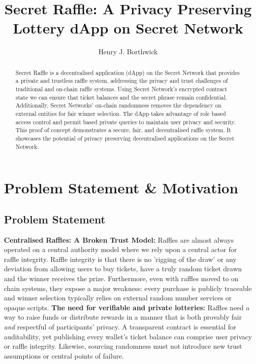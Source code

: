 \documentclass[9pt]{extarticle}
\title{Secret Raffle: A Privacy Preserving Lottery dApp on Secret Network}
\author{Henry J. Borthwick}
\begin{document}
\maketitle

\begin{abstract}
Secret Raffle is a decentralised application (dApp) on the Secret Network that provides a private and trustless raffle system, addressing the privacy and trust challenges of traditional and on-chain raffle systems. Using Secret Network's encrypted contract state we can ensure that ticket balances and the secret phrase remain confidential. Additionally, Secret Networks' on-chain randomness removes the dependency on external entities for fair winner selection. The dApp takes advantage of role based access control and permit based private queries to maintain user privacy and security. This proof of concept demonstrates a secure, fair, and decentralised raffle system. It showcases the potential of privacy preserving decentralised applications on the Secret Network.
\end{abstract}

\section{Problem Statement \& Motivation}
\subsection{Problem Statement}
\textbf{Centralised Raffles: A Broken Trust Model:} Raffles are almost always operated on a central authority model where we rely upon a central actor for raffle integrity. Raffle integrity is that there is no 'rigging of the draw' or any deviation from allowing users to buy tickets, have a truly random ticket drawn and the winner receives the prize. Furthermore, even with raffles moved to on chain systems, they expose a major weakness: every purchase is publicly traceable and winner selection typically relies on external random number services or opaque scripts. \textbf{The need for verifiable and private lotteries:} Raffles need a way to raise funds or distribute rewards in a manner that is both provably fair \emph{and} respectful of participants' privacy. A transparent contract is essential for auditability, yet publishing every wallet's ticket balance can comprise user privacy or raffle integrity. Likewise, sourcing randomness must not introduce new trust assumptions or central points of failure.
\end{document}

